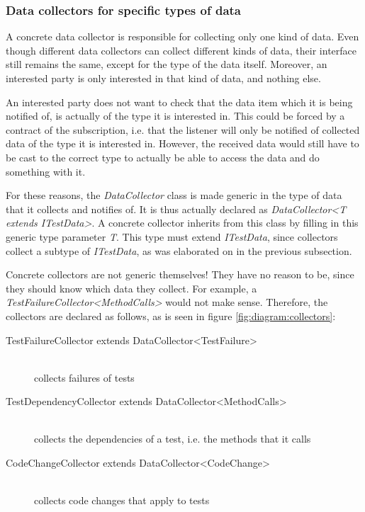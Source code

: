 \documentclass[i2]{oss}
\newcommand{\class}[1]{\emph{#1}}
\begin{document}
\subsubsection{Data collectors for specific types of data}

A concrete data collector is responsible for collecting only one kind of data.
Even though different data collectors can collect different kinds of data, their interface still remains the same, except for the type of the data itself. 
Moreover, an interested party is only interested in that kind of data, and nothing else.

An interested party does not want to check that the data item which it is being notified of, is actually of the type it is interested in.
This could be forced by a contract of the subscription, i.e. that the listener will only be notified of collected data of the type it is interested in.
However, the received data would still have to be cast to the correct type to actually be able to access the data and do something with it.

For these reasons, the \class{DataCollector} class is made generic in the type of data that it collects and notifies of.
It is thus actually declared as \class{DataCollector<T extends ITestData>}.
A concrete collector inherits from this class by filling in this generic type parameter \class{T}.
This type must extend \class{ITestData}, since collectors collect a subtype of \class{ITestData}, as was elaborated on in the previous subsection.

Concrete collectors are not generic themselves!
They have no reason to be, since they should know which data they collect.
For example, a \class{TestFailureCollector<MethodCalls>} would not make sense.
Therefore, the collectors are declared as follows, as is seen in figure \ref{fig:diagram:collectors}:
\begin{description}
\item[TestFailureCollector extends DataCollector<TestFailure>] \hfill \\ collects failures of tests
\item[TestDependencyCollector extends DataCollector<MethodCalls>] \hfill \\ collects the dependencies of a test, i.e. the methods that it calls
\item[CodeChangeCollector extends DataCollector<CodeChange>] \hfill \\ collects code changes that apply to tests
\end{description}
\end{document}
